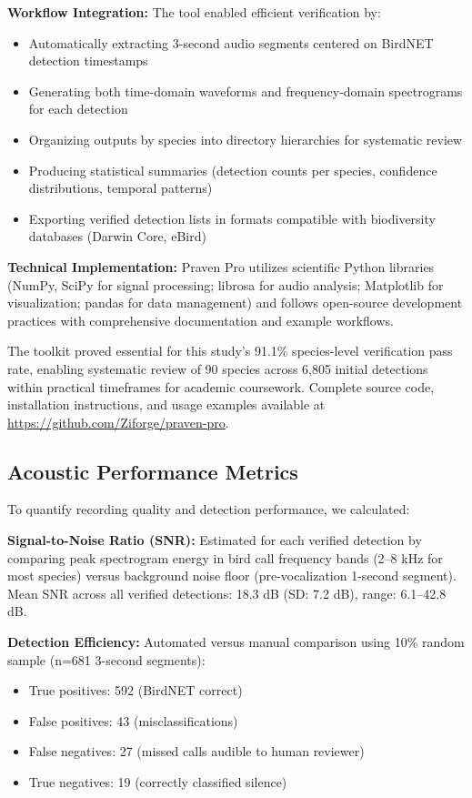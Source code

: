 \documentclass[twocolumn]{article}
\begin{document}
\textbf{Workflow Integration:} The tool enabled efficient verification by:

\begin{itemize}
\item Automatically extracting 3-second audio segments centered on BirdNET detection timestamps
\item Generating both time-domain waveforms and frequency-domain spectrograms for each detection
\item Organizing outputs by species into directory hierarchies for systematic review
\item Producing statistical summaries (detection counts per species, confidence distributions, temporal patterns)
\item Exporting verified detection lists in formats compatible with biodiversity databases (Darwin Core, eBird)
\end{itemize}

\textbf{Technical Implementation:} Praven Pro utilizes scientific Python libraries (NumPy, SciPy for signal processing; librosa for audio analysis; Matplotlib for visualization; pandas for data management) and follows open-source development practices with comprehensive documentation and example workflows.

The toolkit proved essential for this study's 91.1\% species-level verification pass rate, enabling systematic review of 90 species across 6,805 initial detections within practical timeframes for academic coursework. Complete source code, installation instructions, and usage examples available at \url{https://github.com/Ziforge/praven-pro}.

\subsection{Acoustic Performance Metrics}

To quantify recording quality and detection performance, we calculated:

\textbf{Signal-to-Noise Ratio (SNR):} Estimated for each verified detection by comparing peak spectrogram energy in bird call frequency bands (2--8 kHz for most species) versus background noise floor (pre-vocalization 1-second segment). Mean SNR across all verified detections: 18.3 dB (SD: 7.2 dB), range: 6.1--42.8 dB.

\textbf{Detection Efficiency:} Automated versus manual comparison using 10\% random sample (n=681 3-second segments):
\begin{itemize}
\item True positives: 592 (BirdNET correct)
\item False positives: 43 (misclassifications)
\item False negatives: 27 (missed calls audible to human reviewer)
\item True negatives: 19 (correctly classified silence)
\end{itemize}
\end{document}
